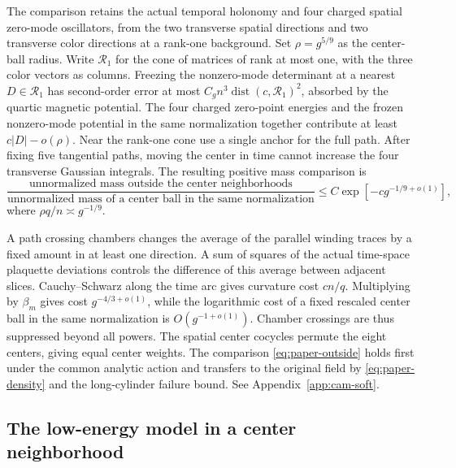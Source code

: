 \documentclass[11pt,a4paper]{article}
\numberwithin{equation}{section}
\begin{document}
The comparison retains the actual temporal holonomy and four charged spatial zero-mode oscillators, from the two transverse spatial directions and two transverse color directions at a rank-one background. Set \(\rho=g^{5/9}\) as the center-ball radius. Write \(\mathcal R_1\) for the cone of matrices of rank at most one, with the three color vectors as columns. Freezing the nonzero-mode determinant at a nearest \(D\in\mathcal R_1\) has second-order error at most \(C_gn^3\operatorname{dist}(c,\mathcal R_1)^2\), absorbed by the quartic magnetic potential. The four charged zero-point energies and the frozen nonzero-mode potential in the same normalization together contribute at least \(c|D|-o(\rho)\). Near the rank-one cone use a single anchor for the full path. After fixing five tangential paths, moving the center in time cannot increase the four transverse Gaussian integrals. The resulting positive mass comparison is
\begin{equation}
 \frac{\text{unnormalized mass outside the center neighborhoods}}
      {\text{unnormalized mass of a center ball in the same normalization}}
       \le C\exp[-c g^{-1/9+o(1)}],
 \label{eq:paper-outside}
\end{equation}
where \(\rho q/n\asymp g^{-1/9}\).

A path crossing chambers changes the average of the parallel winding traces by a fixed amount in at least one direction. A sum of squares of the actual time-space plaquette deviations controls the difference of this average between adjacent slices. Cauchy--Schwarz along the time arc gives curvature cost \(cn/q\). Multiplying by \(\beta_m\) gives cost \(g^{-4/3+o(1)}\), while the logarithmic cost of a fixed rescaled center ball in the same normalization is \(O(g^{-1+o(1)})\). Chamber crossings are thus suppressed beyond all powers. The spatial center cocycles permute the eight centers, giving equal center weights. The comparison \eqref{eq:paper-outside} holds first under the common analytic action and transfers to the original field by \eqref{eq:paper-density} and the long-cylinder failure bound. See Appendix~\ref{app:cam-soft}.

\subsection{The low-energy model in a center neighborhood}
\end{document}
